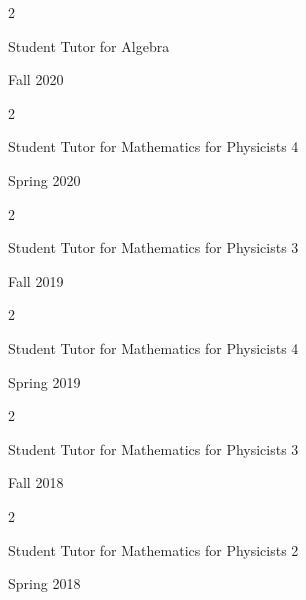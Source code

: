 \documentclass[10pt, letterpaper]{article}
\newenvironment{twocolentry}[2][]{
    \onecolentry
    \def\secondColumn{#2}
    \setcolumnwidth{\fill, 4.5 cm}
    \begin{paracol}{2}
}{
    \switchcolumn \raggedleft \secondColumn
    \end{paracol}
    \endonecolentry
} %
\begin{document}
  \begin{twocolentry}{

    Fall 2020
           
        }
           Student Tutor for Algebra 
            
           
        \end{twocolentry}
        
 \vspace{0.2cm}

 \begin{twocolentry}{

    Spring 2020
           
        }
           Student Tutor for Mathematics for Physicists 4
            
           
        \end{twocolentry}
        
 \vspace{0.2cm}

  \begin{twocolentry}{

    Fall 2019
           
        }
           Student Tutor for Mathematics for Physicists 3
            
           
        \end{twocolentry}
        
 \vspace{0.2cm}

  \begin{twocolentry}{

    Spring 2019
           
        }
           Student Tutor for Mathematics for Physicists 4
            
           
        \end{twocolentry}
        
 \vspace{0.2cm}

  \begin{twocolentry}{

    Fall 2018
           
        }
           Student Tutor for Mathematics for Physicists 3
            
           
        \end{twocolentry}
        
 \vspace{0.2cm}

 \begin{twocolentry}{

    Spring 2018
           
        }
           Student Tutor for Mathematics for Physicists 2
            
           
        \end{twocolentry}
        
\end{document}
